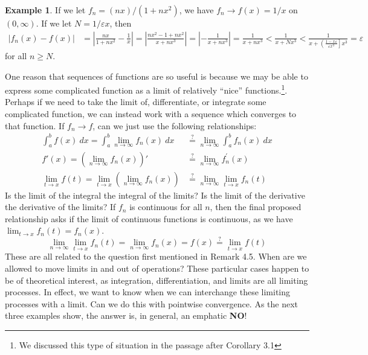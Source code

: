 \documentclass{article}
\theoremstyle{definition}
\newtheorem{example}{Example}[section]
\begin{document}
	\begin{example}
		If we let $ f_n=(nx)/(1+nx^2) $, we have $ f_n\to f(x)=1/x $ on $ (0,\infty) $. 
		If we let $ N=1/\varepsilon x $, then \begin{align*}
			|f_n(x)-f(x)|&=\left\lvert\frac{nx}{1+nx^2}-\frac{1}{x}\right\rvert=\left\lvert\frac{nx^2-1+nx^2}{x+nx^3}\right\rvert=\left\lvert-\frac{1}{x+nx^3}\right\rvert=\frac{1}{x+nx^3}<\frac{1}{x+Nx^3}<\frac{1}{x+\left(\frac{1-x\varepsilon}{\varepsilon x^3}\right]x^3}=\varepsilon
		\end{align*} for all $ n\ge N $. 
	\end{example}
	One reason that sequences of functions are so useful is because we may be able to express some complicated function as a limit of relatively ``nice'' functions.\footnote{We discussed this type of situation in the passage after Corollary 3.1}. Perhaps if we need to take the limit of, differentiate, or integrate some complicated function, we can instead work with a sequence which converges to that function. If $ f_n\to f $, can we just use the following relationships:
	\begin{align*}
		\int_{a}^{b}f(x)\ dx=\int_{a}^{b}\lim\limits_{n\to\infty}f_n(x)\ dx&\stackrel{?}{=}\lim\limits_{n\to\infty}\int_{a}^{b}f_n(x)\ dx\\
		f'(x)=\left(\lim\limits_{n\to\infty}f_n(x)\right)'&\stackrel{?}{=}\lim\limits_{n\to\infty}f_n^\prime(x)\\
		\lim\limits_{t\to x}f(t)= \lim\limits_{t\to x }\left(\lim\limits_{n\to\infty}f_n(x)\right)&\stackrel{?}{=}\lim\limits_{n\to\infty}\lim\limits_{t\to x}f_n(t)
	\end{align*}
	Is the limit of the integral the integral of the limits? Is the limit of the derivative the derivative of the limits? If $ f_n $ is continuous for all $ n $, then the final proposed relationship asks if the limit of continuous functions is continuous, as we have $ \lim_{t\to x}f_n(t)=f_n(x) $. $$	\lim\limits_{n\to\infty}\lim\limits_{t\to x}f_n(t)=\lim\limits_{n\to \infty }f_n(x)=f(x)\stackrel{?}{=}\lim_{t\to x} f(t) $$
	These are all related to the question first mentioned in Remark 4.5. When are we allowed to move limits in and out of operations? These particular cases happen to be of theoretical interest, as integration, differentiation, and limits are all limiting processes. In effect, we want to know when we can interchange these limiting processes with a limit. Can we do this with pointwise convergence. As the next three examples show, the answer is, in general, an emphatic \textbf{NO}!
\end{document}
